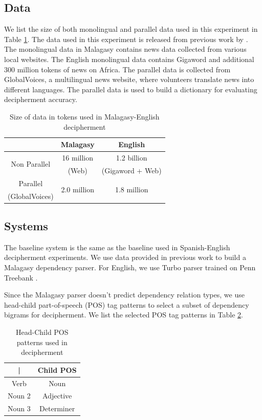 \subsection{Data}
We list the size of both monolingual and parallel data used in this experiment in Table \ref{mlg-en-data}. The data used in this experiment is released from previous work by . The monolingual data in Malagasy contains news data collected from various local websites. The English monolingual data contains Gigaword and additional 300 million tokens of news on Africa. The parallel data is collected from GlobalVoices, a multilingual news website, where volunteers translate news into different languages. The parallel data is used to build a dictionary for evaluating decipherment accuracy. 

 \begin{table}
 \begin{center}
 \begin{tabular}{ |c|c|c| } \hline
             & Malagasy & English \\ \hline
\multirow{2}{*}{Non Parallel} & 16 million & 1.2 billion\\ 
& (Web) & (Gigaword + Web) \\ \hline
Parallel & \multirow{2}{*}{2.0 million} & \multirow{2}{*}{1.8 million} \\
(GlobalVoices) & &  \\ \hline
 \end{tabular}
 \caption{Size of data in tokens used in Malagasy-English decipherment}
 \label{mlg-en-data}
 \end{center}
 \end{table}
 
\subsection{Systems}
The baseline system is the same as the baseline used in Spanish-English decipherment experiments. We use data provided in previous work \cite{dou-vaswani-knight:2014:EMNLP2014} to build a Malagasy dependency parser. For English, we use Turbo parser trained on Penn Treebank \cite{TurboParser}.  

Since the Malagasy parser doesn't predict dependency relation types, we use head-child part-of-speech (POS) tag patterns to select a subset of dependency bigrams for decipherment. We list the selected POS tag patterns in Table \ref{mlg-en-dep-type}.

%
 \begin{table}
 \begin{center}
 \begin{tabular}{ |c|c}| } \hline
          Head POS & Child POS \\ \hline
Verb & Noun \\ \hline
Noun 2 & Adjective \\ \hline
Noun 3 & Determiner \\ \hline
 \end{tabular}
 \caption{Head-Child POS patterns used in decipherment}
 \label{mlg-en-dep-type}
 \end{center}
 \end{table}
%

